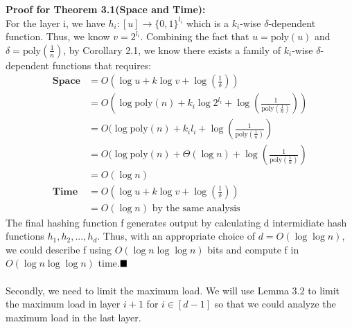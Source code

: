\documentclass[a4paper, english]{paper}
\begin{document}
	\noindent\textbf{Proof for Theorem 3.1(Space and Time):} \\
	For the layer i, we have $h_i:[u]\rightarrow\{0,1\}^{l_i}$ which is a $k_i$-wise $\delta$-dependent function. Thus, we know $v = 2^{l_i}$. Combining the fact that $u = \text{poly}(u)$ and $\delta=\text{poly}(\frac1n)$, by Corollary 2.1, we know there exists a family of $k_i$-wise $\delta$-dependent functions that requires:
\begin{align*}
\textbf{Space} &= O(\log u+k\log v+\log(\frac1\delta))\\
&= O(\log \text{poly}(n) + k_i\log 2^{l_i}+\log(\frac1{\text{poly}(\frac1n)}))\\
&= O(\log \text{poly}(n) + k_il_i+\log(\frac1{\text{poly}(\frac1n)})\\
&= O(\log \text{poly}(n) + \Theta(\log n)+\log(\frac1{\text{poly}(\frac1n)})\\
&= O(\log n)\\
\textbf{Time} &= O(\log u+k\log v+\log(\frac1\delta))\\
&=  O(\log n)\text{ by the same analysis}
\end{align*}
The final hashing function f generates output by calculating d intermidiate hash functions $h_1,h_2,...,h_d$. Thus, with an appropriate choice of $d= O(\log\log n)$, we could describe f using $O(\log n\log\log n)$ bits and compute f in $O(\log n\log\log n)$ time.$\hfill\blacksquare$\\\\
	Secondly, we need to limit the maximum load. We will use Lemma 3.2 to limit the maximum load in layer $i+1$ for $i\in[d-1]$ so that we could analyze the maximum load in the last layer.\\
	
\end{document}
